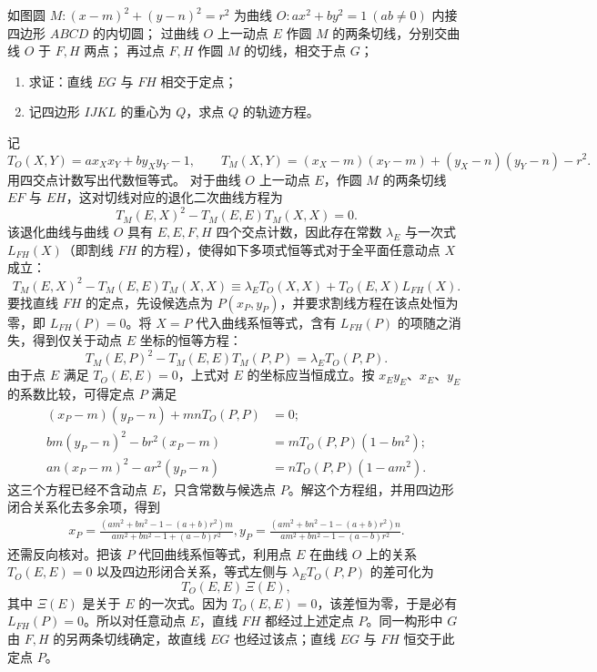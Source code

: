 \begin{example}
如图圆 \(M: (x - m)^2 + (y - n)^2 = r^2\) 为曲线 \(O: ax^2 + by^2 = 1\ (ab \neq 0)\) 内接四边形 \(ABCD\) 的内切圆；
过曲线 \(O\) 上一动点 \(E\) 作圆 \(M\) 的两条切线，分别交曲线 \(O\) 于 \(F, H\) 两点；
再过点 \(F, H\) 作圆 \(M\) 的切线，相交于点 \(G\)；
\begin{enumerate}
\item[(1)] 求证：直线 \(EG\) 与 \(FH\) 相交于定点；
\item[(2)] 记四边形 \(IJKL\) 的重心为 \(Q\)，求点 \(Q\) 的轨迹方程。
\end{enumerate}
\end{example}
\begin{solution}
记
\[ T_O(X, Y) = a x_X x_Y + b y_X y_Y - 1, \qquad T_M(X, Y) = (x_X - m)(x_Y - m) + (y_X - n)(y_Y - n) - r^2. \]
用四交点计数写出代数恒等式。
对于曲线 $O$ 上一动点 $E$，作圆 $M$ 的两条切线 $EF$ 与 $EH$，这对切线对应的退化二次曲线方程为
\[ T_M(E, X)^2 - T_M(E, E) T_M(X, X) = 0. \]
该退化曲线与曲线 $O$ 具有 $E,E,F,H$ 四个交点计数，因此存在常数 $\lambda_E$ 与一次式 $L_{FH}(X)$（即割线 $FH$ 的方程），使得如下多项式恒等式对于全平面任意动点 $X$ 成立：
\[ T_M(E, X)^2 - T_M(E, E) T_M(X, X) \equiv \lambda_E T_O(X, X) + T_O(E, X) L_{FH}(X). \]
要找直线 $FH$ 的定点，先设候选点为 $P(x_P,y_P)$，并要求割线方程在该点处恒为零，即 $L_{FH}(P)=0$。将 $X=P$ 代入曲线系恒等式，含有 $L_{FH}(P)$ 的项随之消失，得到仅关于动点 $E$ 坐标的恒等方程：
\[ T_M(E, P)^2 - T_M(E, E) T_M(P, P) = \lambda_E T_O(P, P). \]
由于点 $E$ 满足 $T_O(E, E) = 0$，上式对 $E$ 的坐标应当恒成立。按 $x_E y_E$、$x_E$、$y_E$ 的系数比较，可得定点 $P$ 满足
\begin{align*}
(x_P - m)(y_P - n) + m n T_O(P, P) &= 0; \\
b m (y_P - n)^2 - b r^2 (x_P - m) &= m T_O(P, P) (1 - b n^2); \\
a n (x_P - m)^2 - a r^2 (y_P - n) &= n T_O(P, P) (1 - a m^2).
\end{align*}
这三个方程已经不含动点 $E$，只含常数与候选点 $P$。解这个方程组，并用四边形闭合关系化去多余项，得到
\begin{align*}
x_P = \frac{(am^2 + bn^2 - 1 - (a + b)r^2)m}{am^2 + bn^2 - 1 + (a - b)r^2}, y_P = \frac{(am^2 + bn^2 - 1 - (a + b)r^2)n}{am^2 + bn^2 - 1 - (a - b)r^2}.
\end{align*}
还需反向核对。把该 $P$ 代回曲线系恒等式，利用点 $E$ 在曲线 $O$ 上的关系 $T_O(E,E)=0$ 以及四边形闭合关系，等式左侧与 $\lambda_ET_O(P,P)$ 的差可化为
\[
T_O(E,E)\,\Xi(E),
\]
其中 $\Xi(E)$ 是关于 $E$ 的一次式。因为 $T_O(E,E)=0$，该差恒为零，于是必有 $L_{FH}(P)=0$。所以对任意动点 $E$，直线 $FH$ 都经过上述定点 $P$。同一构形中 $G$ 由 $F,H$ 的另两条切线确定，故直线 $EG$ 也经过该点；直线 $EG$ 与 $FH$ 恒交于此定点 $P$。\\

\end{solution}
